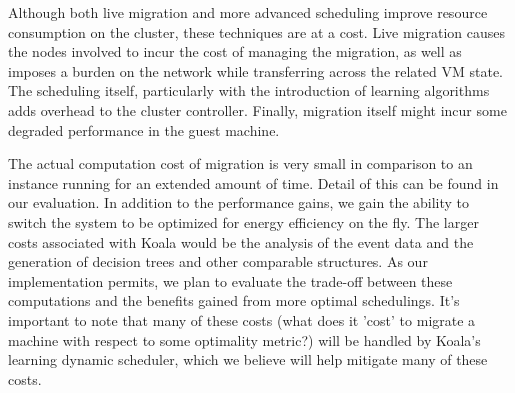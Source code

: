 Although both live migration and more advanced scheduling improve resource consumption on the cluster, these techniques are at a cost.  Live migration causes the nodes involved to incur the cost of managing the migration, as well as imposes a burden on the network while transferring across the related VM state.  The scheduling itself, particularly with the introduction of learning algorithms adds overhead to the cluster controller.  Finally, migration itself might incur some degraded performance in the guest machine.

The actual computation cost of migration is very small in comparison to an instance running for an extended amount of time.  Detail of this can be found in our evaluation.  In addition to the performance gains, we gain the ability to switch the system to be optimized for energy efficiency on the fly.  The larger costs associated with Koala would be the analysis of the event data and the generation of decision trees and other comparable structures.  As our implementation permits, we plan to evaluate the trade-off between these computations and the benefits gained from more optimal schedulings.  It's important to note that many of these costs (what does it 'cost' to migrate a machine with respect to some optimality metric?) will be handled by Koala's learning dynamic scheduler, which we believe will help mitigate many of these costs.

